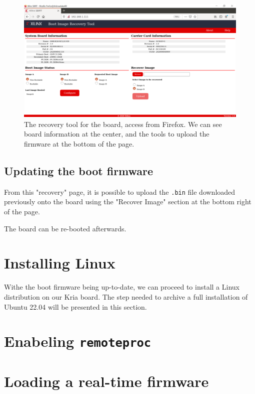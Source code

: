 \documentclass[10pt]{article}
\begin{document}
\begin{figure}[htbp]
\centering
\includegraphics[width=1\textwidth]{img/recovery.png}
\caption{\label{fig:org616c747}The recovery tool for the board, access from Firefox. We can see board information at the center, and the tools to upload the firmware at the bottom of the page.}
\end{figure}

\subsection{Updating the boot firmware}
\label{sec:org43e01fa}
From this "recovery" page, it is possible to upload the \texttt{.bin} file downloaded previously onto
the board using the "Recover Image" section at the bottom right of the page.

The board can be re-booted afterwards.

\section{Installing Linux}
\label{sec:org7b846a8}
Withe the boot firmware being up-to-date, we can proceed to install a Linux distribution
on our Kria board. The step needed to archive a full installation of Ubuntu 22.04
will be presented in this section.

\section{Enabeling \texttt{remoteproc}}
\label{sec:orga3c46a2}

\section{Loading a real-time firmware}
\label{sec:org22b0fae}
\end{document}
